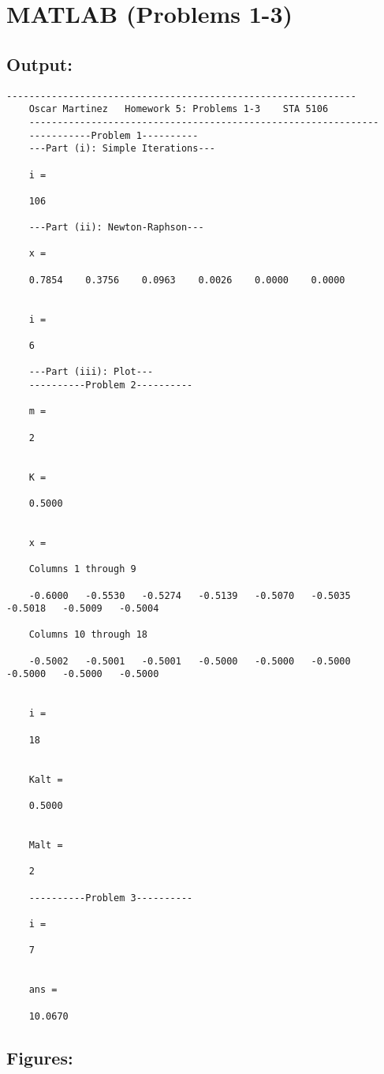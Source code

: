 \documentclass[12pt]{article}
\begin{document}
	
	\section*{MATLAB (Problems 1-3)}
	\subsection*{Output:}
	\begin{Verbatim}[fontsize=\small]
	--------------------------------------------------------------
	Oscar Martinez 	 Homework 5: Problems 1-3 	 STA 5106
	--------------------------------------------------------------
	-----------Problem 1----------
	---Part (i): Simple Iterations---
	
	i =
	
	106
	
	---Part (ii): Newton-Raphson---
	
	x =
	
	0.7854    0.3756    0.0963    0.0026    0.0000    0.0000
	
	
	i =
	
	6
	
	---Part (iii): Plot---
	----------Problem 2----------
	
	m =
	
	2
	
	
	K =
	
	0.5000
	
	
	x =
	
	Columns 1 through 9
	
	-0.6000   -0.5530   -0.5274   -0.5139   -0.5070   -0.5035   -0.5018   -0.5009   -0.5004
	
	Columns 10 through 18
	
	-0.5002   -0.5001   -0.5001   -0.5000   -0.5000   -0.5000   -0.5000   -0.5000   -0.5000
	
	
	i =
	
	18
	
	
	Kalt =
	
	0.5000
	
	
	Malt =
	
	2
	
	----------Problem 3----------
	
	i =
	
	7
	
	
	ans =
	
	10.0670
	\end{Verbatim}
	
	\subsection*{Figures:}
	\begin{center}
	\end{center}
	
\end{document}
